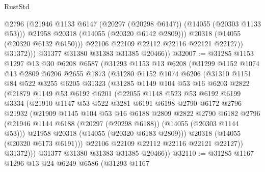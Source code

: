 \begin{lexlean}{RustStd}
\begin{coremodule}
                      @2796
                      (@21946 @1133 @6147 (@20297 (@20298 @6147)) (@14055 (@20303 @1133 @53)))
                      @21958
                      @20318
                      (@14055 (@20320 @6142 @2809)))
                    @20318
                    (@14055 (@20320 @6132 @6150)))
                  @22106
                  @22109
                  @22112
                  @22116
                  @22121
                  @22127))
              @31372)))
        @31377
        @31380
        @31383
        @31385
        @20466))
@32007 := @31285
    @1153
    @1297
    @13
    @30
    @6208
    @6587
    (@31293
      @1153
      @13
      @6208
      (@31299
        @1152
        @1074
        @13
        @2809
        @6206
        @2655
        @1873
        (@31280
          @1152
          @1074
          @6206
          (@31310
            @1151
            @84
            @522
            @3255
            @6205
            @31323
            (@31285
              @1149
              @104
              @53
              @16
              @6203
              @2822
              (@21879
                @1149
                @53
                @6192
                @6201
                (@22055
                  @1148
                  @523
                  @53
                  @6192
                  @6199
                  @3334
                  (@21910
                    @1147
                    @53
                    @522
                    @3281
                    @6191
                    @6198
                    @2790
                    @6172
                    @2796
                    @21932
                    (@21909
                      @1145
                      @104
                      @53
                      @16
                      @6188
                      @2809
                      @2822
                      @2790
                      @6182
                      @2796
                      (@21946 @1144 @6188 (@20297 (@20298 @6188)) (@14055 (@20303 @1144 @53)))
                      @21958
                      @20318
                      (@14055 (@20320 @6183 @2809)))
                    @20318
                    (@14055 (@20320 @6173 @6191)))
                  @22106
                  @22109
                  @22112
                  @22116
                  @22121
                  @22127))
              @31372)))
        @31377
        @31380
        @31383
        @31385
        @20466))
@32110 := @31285
    @1167
    @1296
    @13
    @24
    @6249
    @6586
    (@31293
      @1167

\end{coremodule}
\end{lexlean}
